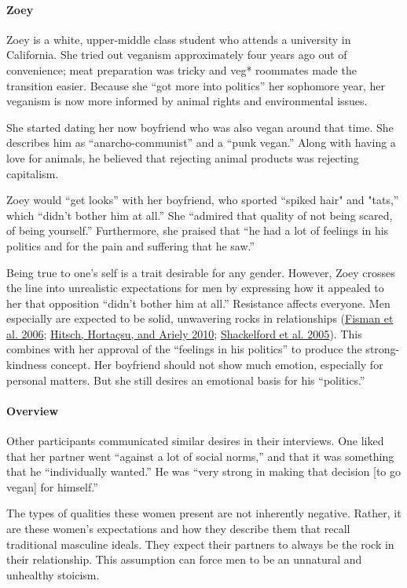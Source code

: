 \documentclass[twoside]{report}
\begin{document}
\begin{multicols}{2}
\paragraph{Zoey}

Zoey is a white, upper-middle class student who attends a university in
California. She tried out veganism approximately four years ago out of
convenience; meat preparation was tricky and veg* roommates made the transition easier. Because she ``got more into politics'' her sophomore year, her veganism is now more informed by animal rights and environmental issues.

She started dating her now boyfriend who was also vegan around that time. She describes him as ``anarcho-communist'' and a ``punk vegan.'' Along with having a love for animals, he believed that rejecting animal products was rejecting capitalism.

Zoey would ``get looks'' with her boyfriend, who sported ``spiked hair" and
"tats,'' which ``didn't bother him at all.'' She ``admired that quality
of not being scared, of being yourself.'' Furthermore, she praised that
``he had a lot of feelings in his politics and for the pain and
suffering that he saw.''

Being true to one's self is a trait desirable for any gender. However,
Zoey crosses the line into unrealistic expectations for men by
expressing how it appealed to her that opposition ``didn't bother him at
all.'' Resistance affects everyone. Men especially are expected to be
solid, unwavering rocks in relationships (\hyperlink{fisman}{Fisman et al. 2006}; \hyperlink{hitsch2}{Hitsch, Hortaçsu, and Ariely 2010}; \hyperlink{shackelford}{Shackelford et al. 2005}). This combines
with her approval of the ``feelings in his politics'' to produce the
strong-kindness concept. Her boyfriend should not show much emotion,
especially for personal matters. But she still desires an emotional
basis for his ``politics.''
%
\paragraph{Overview}

Other participants communicated similar desires in their interviews. One
liked that her partner went ``against a lot of social norms,'' and that
it was something that he ``individually wanted.'' He was ``very strong
in making that decision {[}to go vegan{]} for himself.''

The types of qualities these women present are not inherently negative.
Rather, it are these women's expectations and how they describe them
that recall traditional masculine ideals. They expect their partners to
always be the rock in their relationship. This assumption can force men
to be an unnatural and unhealthy stoicism. 


\end{multicols}
\end{document}

